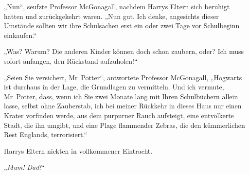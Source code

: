„Nun“, seufzte Professor McGonagall, nachdem Harrys Eltern sich beruhigt hatten und zurückgekehrt waren.
„Nun gut. Ich denke, angesichts dieser Umstände sollten wir ihre Schulsachen erst ein oder zwei Tage vor Schulbeginn einkaufen.“

„Was? Warum? Die anderen Kinder können doch schon zaubern, oder? Ich muss sofort anfangen, den Rückstand aufzuholen!“

„Seien Sie versichert, Mr~Potter“, antwortete Professor McGonagall,
„Hogwarts ist durchaus in der Lage, die Grundlagen zu vermitteln. Und ich vermute, Mr~Potter, dass, wenn ich Sie zwei Monate lang mit Ihren Schulbüchern allein lasse, selbst ohne Zauberstab, ich bei meiner Rückkehr in dieses Haus nur einen Krater vorfinden werde, aus dem purpurner Rauch aufsteigt, eine entvölkerte Stadt, die ihn umgibt, und eine Plage flammender Zebras, die den kümmerlichen Rest Englands, terrorisiert.“

Harrys Eltern nickten in vollkommener Eintracht.

„\emph{Mum! Dad!}“


